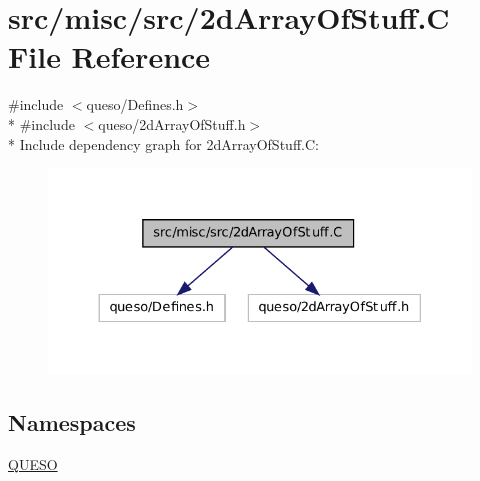 \hypertarget{2d_array_of_stuff_8_c}{\section{src/misc/src/2d\-Array\-Of\-Stuff.C File Reference}
\label{2d_array_of_stuff_8_c}
}
{\ttfamily \#include $<$queso/\-Defines.\-h$>$}\\*
{\ttfamily \#include $<$queso/2d\-Array\-Of\-Stuff.\-h$>$}\\*
Include dependency graph for 2d\-Array\-Of\-Stuff.C\-:
\nopagebreak
\begin{figure}[H]
\begin{center}
\leavevmode
\includegraphics[width=330pt]{2d_array_of_stuff_8_c__incl}
\end{center}
\end{figure}
\subsection*{Namespaces}
\begin{DoxyCompactItemize}
\item 
\hyperlink{namespace_q_u_e_s_o}{Q\-U\-E\-S\-O}
\end{DoxyCompactItemize}
